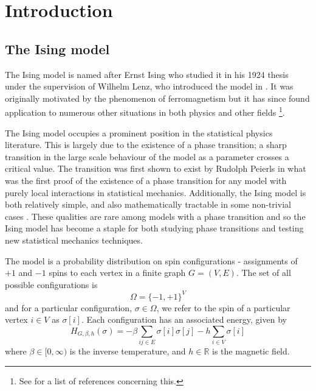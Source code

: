 \chapter{Introduction}
\label{Ch:CouplingIntro}



\section{The Ising model}
\label{sec:Ising}
	The Ising model is named after Ernst Ising who studied it in his 1924 thesis \cite{Ising1925-nd} under the supervision of Wilhelm Lenz, who introduced the model in \cite{Lenz1920-bn}. It was originally motivated by the phenomenon of ferromagnetism but it has since found application to numerous other situations in both physics and other fields \footnote{See \cite[notes of Section 1.4.2]{Friedli2017-xm} for a list of references concerning this.}.

	The Ising model occupies a prominent position in the statistical physics literature. This is largely due to the existence of a phase transition; a sharp transition in the large scale behaviour of the model as a parameter crosses a critical value. The transition was first shown to exist by Rudolph Peierls \cite{Peierls1936-pu} in what was the first proof of the existence of a phase transition for any model with purely local interactions in statistical mechanics.
	Additionally, the Ising model is both relatively simple, and also mathematically tractable in some non-trivial cases \cite{Onsager1944-li}. These qualities are rare among models with a phase transition and so the Ising model has become a staple for both studying phase transitions and testing new statistical mechanics techniques.

	The model is a probability distribution on spin configurations - assignments of $+1$ and $-1$ spins to each vertex in a finite graph $G = (V, E)$. The set of all possible configurations is
	\begin{equation}
		\Omega = \{-1, +1\}^V
	\end{equation}
	and for a particular configuration, $\sigma \in \Omega$, we refer to the spin of a particular vertex $i \in V$ as $\sigma[i]$. Each configuration has an associated energy, given by 
	\begin{equation}
		H_{G, \beta, h}(\sigma) = -\beta \sum_{ij \in E} \sigma[i] \sigma[j] - h\sum_{i \in V} \sigma[i]
	\end{equation}
	where $\beta \in [0, \infty)$ is the inverse temperature, and $h \in \mathbb{R}$ is the magnetic field. 

